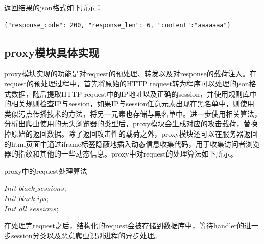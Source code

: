 \documentclass[doctor,privacy,twoside]{buaa_mac}
\begin{document}
返回结果的json格式如下所示：
\lstset{language=JavaScript}
\begin{lstlisting}
{"response_code": 200, "response_len": 6, "content":"aaaaaaa"}
\end{lstlisting}




\subsection{proxy模块具体实现}

proxy模块实现的功能是对request的预处理、转发以及对response的载荷注入。在request的预处理过程中，首先将原始的HTTP request转为程序可以处理的json格式数据，随后提取HTTP request中的IP地址以及正确的session，并使用规则库中的相关规则检查IP与session，如果IP与session任意元素出现在黑名单中，则使用类似污点传播技术的方法，将另一元素也存储与黑名单中。进一步使用相关算法，分析出爬虫使用的无头浏览器的类型后，proxy模块会生成对应的攻击载荷，替换掉原始的返回数据。除了返回攻击性的载荷之外，proxy模块还可以在服务器返回的html页面中通过iframe标签隐蔽地插入动态信息收集代码，用于收集访问者浏览器的指纹和其他的一些动态信息。proxy中对request的处理算法如下所示。

\begin{algorithm}[!h]
  \caption{proxy中的request处理算法}

  $Init$ $black\_{}sessions$;\\
  $Init$ $black\_{}ips$; \\
  $Init$ $all\_{}sessions$;\\  
  
 

\end{algorithm}


在处理完request之后，结构化的request会被存储到数据库中，等待handler的进一步session分类以及恶意爬虫识别进程的异步处理。
\end{document}
